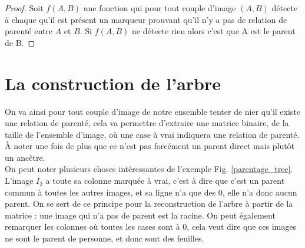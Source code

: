 \documentclass[utf8]{stageM2R} %
\begin{document}
\begin{proof}
  Soit $f(A,B)$ une fonction qui pour tout couple d'image $(A, B)$ détecte à chaque qu'il est présent un marqueur prouvant qu'il n'y a pas de relation de parenté entre $A$ et $B$. Si $f(A,B)$ ne détecte rien alors c'est que A est le parent de B.
\end{proof}

\section{La construction de l'arbre}
On va ainsi pour tout couple d'image de notre ensemble tenter de nier qu'il existe une relation de parenté, cela va permettre d'extraire une matrice binaire, de la taille de l'ensemble d'image, où une case à vrai indiquera une relation de parenté. À noter une fois de plus que ce n'est pas forcément un parent direct mais plutôt un ancêtre. \\ \indent
On peut noter plusieurs choses intéressantes de l'exemple Fig. \ref{parentage_tree}. L'image $I_{2}$ a toute sa colonne marquée à vrai, c'est à dire que c'est un parent commun à toutes les autres images, et sa ligne n'a que des 0, elle n'a donc aucun parent. On se sert de ce principe pour la reconstruction de l'arbre à partir de la matrice : une image qui n'a pas de parent est la racine. On peut également remarquer les colonnes où toutes les cases sont à 0, cela veut dire que ces images ne sont le parent de personne, et donc sont des feuilles.
\end{document}
